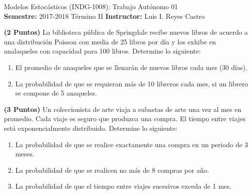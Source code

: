 \documentclass[ a4paper, twoside, 11pt]{article}
\newcommand{\numero}{01}
\begin{document}
\allowdisplaybreaks



\begin{center}
\Large Modelos Estoc\'asticos (INDG-1008): Trabajo Aut\'onomo \numero \\[1ex]
\small \textbf{Semestre:} 2017-2018 T\'ermino II \qquad
\textbf{Instructor:} Luis I. Reyes Castro
\end{center}
\fullskip

%
\halfskip

\begin{problem}
\textbf{(2 Puntos)} La biblioteca p\'ublica de Springdale recibe nuevos libros de acuerdo a una distribuci\'on Poisson con media de 25 libros por d\'ia y los exhibe en analaqueles con capacidad para 100 libros. Determine lo siguiente: 
\begin{enumerate}[label=\alph*)]
\item El promedio de anaqueles que se llenar\'an de nuevos libros cada mes (30 d\'ias). 
\item La probabilidad de que se requieran m\'as de 10 libreros cada mes, si un librero se compone de 5 anaqueles.
\end{enumerate}

\end{problem}
\vspace{\baselineskip}

\begin{problem}
\textbf{(3 Puntos)} Un coleccionista de arte viaja a subastas de arte una vez al mes en promedio. Cada viaje es seguro que produzca una compra. El tiempo entre viajes est\'a exponencialmente distribuido. Determine lo siguiente: 
\begin{enumerate}[label=\alph*)]
\item La probabilidad de que se realice exactamente una compra en un periodo de 3 meses. 
\item La probabilidad de que se realicen no m\'as de 8 compras por a\~no. 
\item La probabilidad de que el tiempo entre viajes sucesivos exceda de 1 mes. 
\end{enumerate}

\end{problem}
\vspace{\baselineskip}
\end{document}
